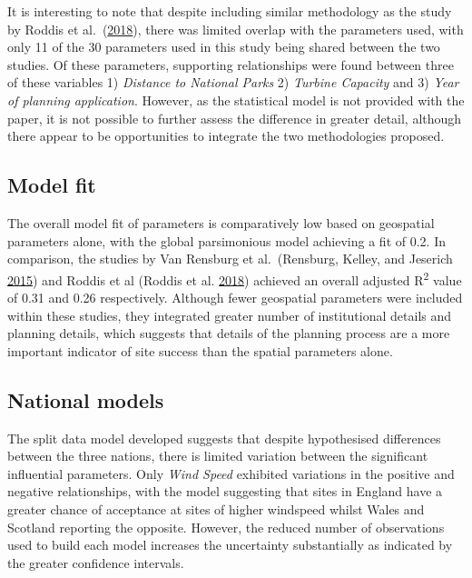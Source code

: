 \documentclass[a4paper,]{article}
\theoremstyle{definition}
\theoremstyle{definition}
\theoremstyle{definition}
\theoremstyle{remark}
\begin{document}
It is interesting to note that despite including similar methodology as
the study by Roddis et al.~(\protect\hyperlink{ref-Roddis2018}{2018}),
there was limited overlap with the parameters used, with only 11 of the
30 parameters used in this study being shared between the two studies.
Of these parameters, supporting relationships were found between three
of these variables 1) \emph{Distance to National Parks} 2) \emph{Turbine
Capacity} and 3) \emph{Year of planning application}. However, as the
statistical model is not provided with the paper, it is not possible to
further assess the difference in greater detail, although there appear
to be opportunities to integrate the two methodologies proposed.

\hypertarget{model-fit}{%
\subsection{Model fit}\label{model-fit}}

The overall model fit of parameters is comparatively low based on
geospatial parameters alone, with the global parsimonious model
achieving a fit of 0.2. In comparison, the studies by Van Rensburg et
al.~(Rensburg, Kelley, and Jeserich
\protect\hyperlink{ref-VanRensburg20}{2015}) and Roddis et al (Roddis et
al. \protect\hyperlink{ref-Roddis2018}{2018}) achieved an overall
adjusted R\textsuperscript{2} value of 0.31 and 0.26 respectively.
Although fewer geospatial parameters were included within these studies,
they integrated greater number of institutional details and planning
details, which suggests that details of the planning process are a more
important indicator of site success than the spatial parameters alone.

\hypertarget{national-models}{%
\subsection{National models}\label{national-models}}

The split data model developed suggests that despite hypothesised
differences between the three nations, there is limited variation
between the significant influential parameters. Only \emph{Wind Speed}
exhibited variations in the positive and negative relationships, with
the model suggesting that sites in England have a greater chance of
acceptance at sites of higher windspeed whilst Wales and Scotland
reporting the opposite. However, the reduced number of observations used
to build each model increases the uncertainty substantially as indicated
by the greater confidence intervals.
\end{document}
